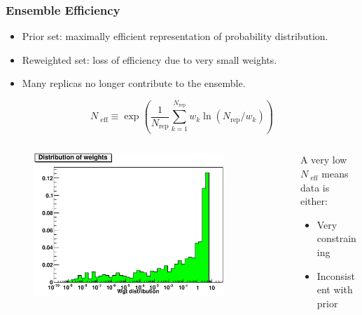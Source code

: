 \documentclass[10pt]{beamer}
\newcommand{\be}{\begin{equation*}}
\newcommand{\ee}{\end{equation*}}
\begin{document}
\begin{frame}
\frametitle{Ensemble Efficiency}

   \begin{itemize}
		\item<1-> Prior set: maximally efficient representation of probability distribution.
		\item<1-> Reweighted set: loss of efficiency due to very small weights.
		\item<1-> Many replicas no longer contribute to the ensemble.
\end{itemize}

  \be N_{\textrm{ eff}} \equiv \exp \left(\frac{1}{N_{\mathrm{rep}}}\sum_{k=1}^{N_{\mathrm{rep}}}w_k\ln(N_{\mathrm{rep}}/w_k)\right)\ee
\begin{columns}
  \begin{column}{0.45\textwidth}
 \begin{figure}[b!]
    \begin{center}
      \includegraphics[width=0.85\textwidth]{wgt-dist-jets-t0.eps}
    \end{center}
\end{figure}

  \end{column}

  \begin{column}{0.55\textwidth}
  A very low $N_{\textrm{ eff}}$ means data is either:
 \begin{itemize}
		\item<1-> Very constraining
		\item<1-> Inconsistent with prior
\end{itemize}
\vskip10pt
     \end{column}
\end{columns}
\end{frame}
\end{document}
